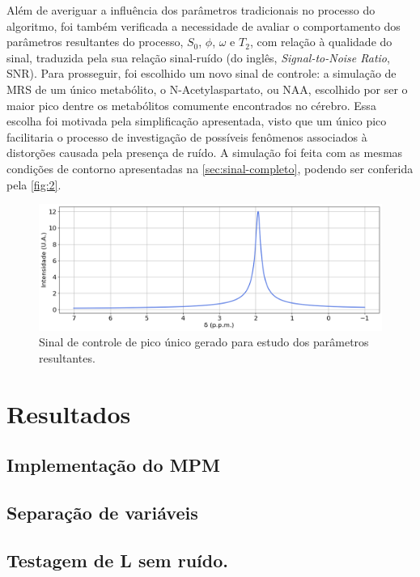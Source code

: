 \documentclass[12pt]{article}
\begin{document}
Além de averiguar a influência dos parâmetros tradicionais no processo do algoritmo, foi também verificada a necessidade de avaliar o 
comportamento dos parâmetros resultantes do processo, $S_0$, $\phi$, $\omega$ e $T_2$, com relação à qualidade do sinal, traduzida pela
sua relação sinal-ruído (do inglês, \textit{Signal-to-Noise Ratio}, SNR). Para prosseguir, foi escolhido um novo sinal de controle: a 
simulação de MRS de um único metabólito, o N-Acetylaspartato, ou NAA, escolhido por ser o maior pico dentre os metabólitos comumente 
encontrados no cérebro. Essa escolha foi motivada pela simplificação apresentada, visto que um único pico facilitaria o processo de 
investigação de possíveis fenômenos associados à distorções causada pela presença de ruído. A simulação foi feita com as mesmas 
condições de contorno apresentadas na \autoref{sec:sinal-completo}, podendo ser conferida pela \autoref{fig:2}.

\begin{figure} [H]
    \includegraphics[scale=0.5]{sinal-unico-pico.png}
    \centering
    \caption{Sinal de controle de pico único gerado para estudo dos parâmetros resultantes.}
    \label{fig:2}
\end{figure}

\section{Resultados}

\subsection{Implementação do MPM}

\subsection{Separação de variáveis}

\subsection{Testagem de L sem ruído.}
\end{document}
